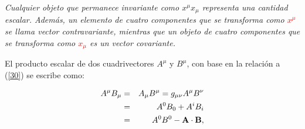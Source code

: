 \begin{solution}

\end{solution}

\vspace{1cm}

\begin{cabox}
\emph{Cualquier objeto que permanece invariante como $x^{\mu }x_{\mu }$ representa una 
cantidad escalar. Además, un elemento de cuatro componentes que se transforma
como \textcolor{red}{$x^{\mu}$} se llama vector contravariante, mientras que un objeto de
cuatro componentes que se transforma como \textcolor{red}{$x_{\mu}$} es un vector covariante.}
\end{cabox}
\noindent

El producto escalar de dos cuadrivectores $A^{\mu }$ y $B^{\mu }$, con base en la relaci\'{o}n a (\ref{30}) se escribe como:

\begin{eqnarray}
A^{\mu }B_{\mu } &=&A_{\mu }B^{\mu }=g_{\mu \nu }A^{\mu }B^{\nu }  \label{31}
\\
&=&A^{0}B_{0}+A^{i}B_{i}  \notag \\
&=&A^{0}B^{0}-\mathbf{A}\cdot \mathbf{B}  \notag,
\end{eqnarray}

